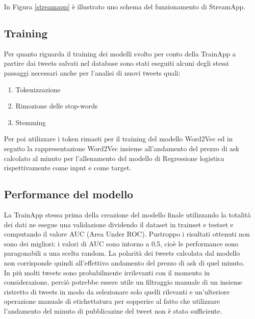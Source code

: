 In Figura \ref{streamapp} è illustrato uno schema del funzionamento di StreamApp.

\subsection{Training}

Per quanto riguarda il training dei modelli svolto per conto della TrainApp a partire dai tweets
salvati nel database sono stati eseguiti alcuni degli stessi passaggi necessari anche per
l'analisi di nuovi tweets quali:

\begin{enumerate}
    \item Tokenizzazione
    \item Rimozione delle stop-words
    \item Stemming
\end{enumerate}

Per poi utilizzare i token rimasti per il training del modello Word2Vec ed in seguito la
rappresentazione Word2Vec insieme all'andamento del prezzo di ask calcolato al minuto
per l'allenamento del modello di Regressione logistica rispettivamente come input e come target.

\subsection{Performance del modello}

La TrainApp stessa prima della creazione del modello finale utilizzando la totalità dei dati
ne esegue una validazione dividendo il dataset in trainset e testset e computando il valore AUC
(Area Under ROC).
Purtroppo i risultati ottenuti non sono dei migliori: i valori di AUC sono intorno a 0.5, cioè
le performance sono paragonabili a una scelta random.
La polarità dei tweets calcolata dal modello non corrisponde quindi all'effettivo andamento del
prezzo di ask di quel minuto.
In più molti tweets sono probabilmente irrilevanti con il momento in considerazione, perciò potrebbe essere utile un
filtraggio manuale di un insieme ristretto di tweets in modo da selezionare solo quelli rilevanti
e un'ulteriore operazione manuale di etichettatura per sopperire al fatto che utilizzare l'andamento
del minuto di pubblicazine del tweet non è stato sufficiente.




